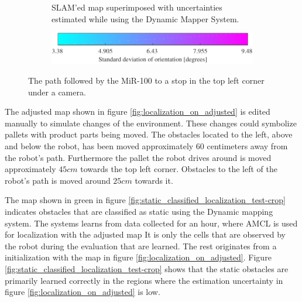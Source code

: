 \begin{figure}[htbp]
\begin{subfigure}[t]{0.45\textwidth}
        \caption{SLAM'ed map superimposed with uncertainties estimated while using the Dynamic Mapper System.}
        \label{fig:simulated_true_map}
    \end{subfigure}
    \begin{subfigure}[t]{1\textwidth}
        \centering
        \includegraphics[scale=1.0]{chapters/evaluation/figures/localization_bar-crop}
    \end{subfigure}
    \caption{The path followed by the MiR-100 to a stop in the top left corner under a camera.}
    \label{fig:test_map_setup}
\end{figure}

The adjusted map shown in figure \ref{fig:localization_on_adjusted} is edited manually to simulate changes of the environment. These changes could symbolize pallets with product parts being moved. 
The obstacles located to the left, above and below the robot, has been moved approximately $60$ centimeters away from the robot's path.
Furthermore the pallet the robot drives around is moved approximately $45cm$ towards the top left corner.
Obstacles to the left of the robot's path is moved around $25cm$ towards it.

The map shown in green in figure \ref{fig:static_classified_localization_test-crop} indicates obstacles that are classified as static using the Dynamic mapping system.
The systems learns from data collected for an hour, where AMCL is used for localization with the adjusted map
It is only the cells that are observed by the robot during the evaluation that are learned. The rest originates from a initialization with the map in figure \ref{fig:localization_on_adjusted}.
Figure \ref{fig:static_classified_localization_test-crop} shows that the static obstacles are primarily learned correctly in the regions where the estimation uncertainty in figure \ref{fig:localization_on_adjusted} is low.

